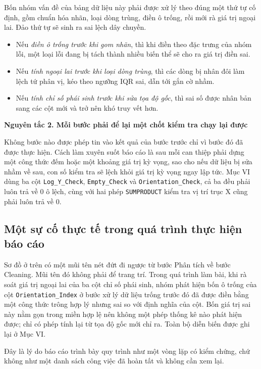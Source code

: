 \documentclass[12pt]{article}
\begin{document}
\noindent Bốn nhóm vấn đề của bảng dữ liệu này phải được xử lý theo đúng một thứ tự cố định, gồm chuẩn hóa nhãn, loại dòng trùng, điền ô trống, rồi mới rà giá trị ngoại lai. Đảo thứ tự sẽ sinh ra sai lệch dây chuyền.

\begin{itemize}
  \item Nếu \emph{điền ô trống trước khi gom nhãn}, thì khi điền theo đặc trưng của nhóm lỗi, một loại lỗi đang bị tách thành nhiều biến thể sẽ cho ra giá trị điền sai.
  \item Nếu \emph{tính ngoại lai trước khi loại dòng trùng}, thì các dòng bị nhân đôi làm lệch tứ phân vị, kéo theo ngưỡng IQR sai, dẫn tới gắn cờ nhầm.
  \item Nếu \emph{tính chỉ số phái sinh trước khi sửa tọa độ gốc}, thì sai số được nhân bản sang các cột mới và trở nên khó truy vết hơn.
\end{itemize}

\noindent \textbf{Nguyên tắc 2. Mỗi bước phải để lại một chốt kiểm tra chạy lại được}

\noindent Không bước nào được phép tin vào kết quả của bước trước chỉ vì bước đó đã được thực hiện. Cách làm xuyên suốt báo cáo là sau mỗi can thiệp phải dựng một công thức đếm hoặc một khoảng giá trị kỳ vọng, sao cho nếu dữ liệu bị sửa nhầm về sau, con số kiểm tra sẽ lệch khỏi giá trị kỳ vọng ngay lập tức. Mục VI dùng ba cột \texttt{Log\_Y\_Check}, \texttt{Empty\_Check} và \texttt{Orientation\_Check}, cả ba đều phải luôn trả về 0 ô lệch, cùng với hai phép \texttt{SUMPRODUCT} kiểm tra vị trí trục X cũng phải luôn trả về 0.

\subsection{Một sự cố thực tế trong quá trình thực hiện báo cáo}

Sơ đồ ở trên có một mũi tên nét đứt đi ngược từ bước Phân tích về bước Cleaning. Mũi tên đó không phải để trang trí. Trong quá trình làm bài, khi rà soát giá trị ngoại lai của ba cột chỉ số phái sinh, nhóm phát hiện bốn ô trống của cột \texttt{Orientation\_Index} ở bước xử lý dữ liệu trống trước đó đã được điền bằng một công thức trông hợp lý nhưng sai so với định nghĩa của cột. Bốn giá trị sai này nằm gọn trong miền hợp lệ nên không một phép thống kê nào phát hiện được; chỉ có phép tính lại từ tọa độ gốc mới chỉ ra. Toàn bộ diễn biến được ghi lại ở Mục VI.

\noindent Đây là lý do báo cáo trình bày quy trình như một vòng lặp có kiểm chứng, chứ không như một danh sách công việc đã hoàn tất và không cần xem lại.
\end{document}
